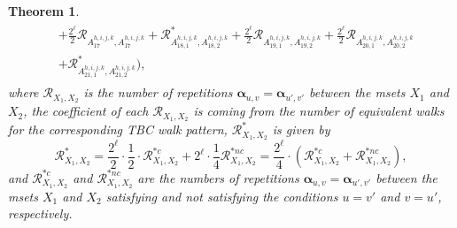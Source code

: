 \documentclass[11pt]{article}
\newtheorem{theorem}[lemma]{Theorem}
\theoremstyle{plain}
\theoremstyle{plain}
\theoremstyle{definition}
\numberwithin{theo}{section}
\newcommand{\balpha}{{\boldsymbol \alpha}}
\newcounter{alp}
\newcounter{rom}
\begin{document}
\begin{theorem}
\begin{align}
\begin{split}
& +\frac{2^\ell}{2}\mathcal{R}_{A_{17}^{h,i,j,k},A_{17}^{h,i,j,k}}+\mathcal{R}_{A_{18,1}^{h,i,j,k},A_{18,2}^{h,i,j,k}}^*+\frac{2^\ell}{2}\mathcal{R}_{A_{19,1}^{h,i,j,k},A_{19,2}^{h,i,j,k}}+\frac{2^\ell}{2}\mathcal{R}_{A_{20,1}^{h,i,j,k},A_{20,2}^{h,i,j,k}} \\
& +\mathcal{R}_{A_{21,1}^{h,i,j,k},A_{21,2}^{h,i,j,k}}^* \biggr),
\end{split}
\end{align}
where $\mathcal{R}_{X_1,X_2}$ is the number of repetitions $\balpha_{u,v}=\balpha_{u',v'}$ between the msets $X_1$ and $X_2$, the coefficient of each $\mathcal{R}_{X_1,X_2}$ is coming from the number of equivalent walks for the corresponding TBC walk pattern, $\mathcal{R}_{X_1,X_2}^*$ is given by
\begin{equation}
\label{counting_cycles_formula_num8cycles_ncxnv_dyadics_asterisk_pattern}
\mathcal{R}_{X_1,X_2}^* = \frac{2^\ell}{2}\cdot\frac{1}{2}\cdot\mathcal{R}_{X_1,X_2}^{*c}+2^\ell\cdot\frac{1}{4}\mathcal{R}_{X_1,X_2}^{*nc} = \frac{2^\ell}{4}\cdot\left(\mathcal{R}_{X_1,X_2}^{*c}+\mathcal{R}_{X_1,X_2}^{*nc}\right),
\end{equation}
and $\mathcal{R}_{X_1,X_2}^{*c}$ and $\mathcal{R}_{X_1,X_2}^{*nc}$ are the numbers of repetitions $\balpha_{u,v}=\balpha_{u',v'}$ between the msets $X_1$ and $X_2$ satisfying and not satisfying the conditions $u=v'$ and $v=u'$, respectively.
\end{theorem}
\end{document}
